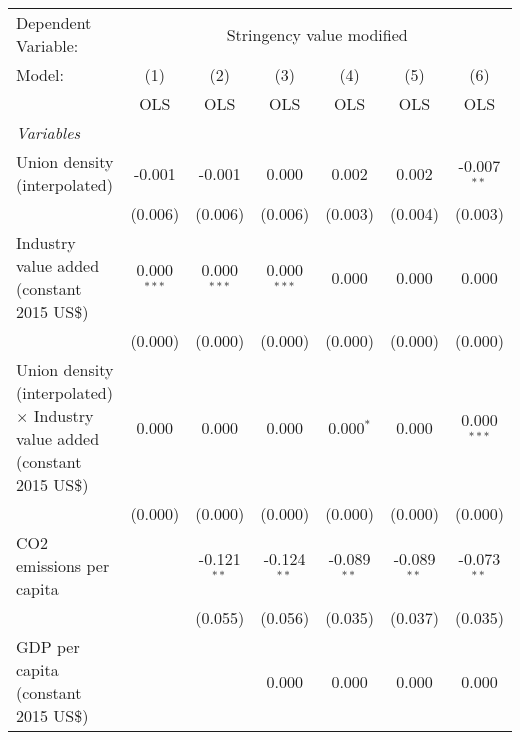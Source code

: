 
\begingroup
\centering
\begin{tabular}{lcccccc}
   \toprule
   Dependent Variable: & \multicolumn{6}{c}{Stringency value modified}\\
   Model:                                                                            & (1)           & (2)           & (3)           & (4)           & (5)           & (6)\\  
                                                                                     &  OLS          & OLS           & OLS           & OLS           & OLS           & OLS\\  
   \midrule
   \emph{Variables}\\
   Union density (interpolated)                                                      & -0.001        & -0.001        & 0.000         & 0.002         & 0.002         & -0.007$^{**}$\\   
                                                                                     & (0.006)       & (0.006)       & (0.006)       & (0.003)       & (0.004)       & (0.003)\\   
   Industry value added (constant 2015 US\$)                                         & 0.000$^{***}$ & 0.000$^{***}$ & 0.000$^{***}$ & 0.000         & 0.000         & 0.000\\   
                                                                                     & (0.000)       & (0.000)       & (0.000)       & (0.000)       & (0.000)       & (0.000)\\   
   Union density (interpolated) $\times$ Industry value added (constant 2015 US\$)   & 0.000         & 0.000         & 0.000         & 0.000$^{*}$   & 0.000         & 0.000$^{***}$\\   
                                                                                     & (0.000)       & (0.000)       & (0.000)       & (0.000)       & (0.000)       & (0.000)\\   
   CO2 emissions per capita                                                          &               & -0.121$^{**}$ & -0.124$^{**}$ & -0.089$^{**}$ & -0.089$^{**}$ & -0.073$^{**}$\\   
                                                                                     &               & (0.055)       & (0.056)       & (0.035)       & (0.037)       & (0.035)\\   
   GDP per capita (constant 2015 US\$)                                               &               &               & 0.000         & 0.000         & 0.000         & 0.000\\   

\end{tabular}
